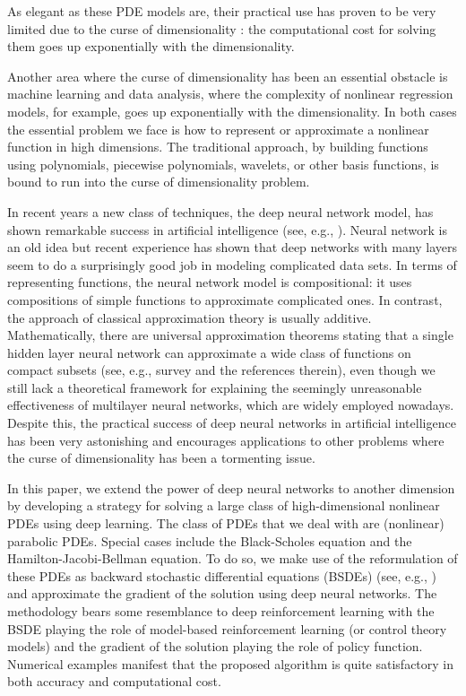 \documentclass[11pt,english]{article}
\begin{document}
As elegant as these PDE models are, their practical use has proven to be 
very limited
due to the curse of dimensionality \cite{Bellman1957}: the computational cost for solving
them goes up exponentially with the dimensionality.

Another area where the curse of dimensionality has been an essential obstacle is
machine learning and data analysis, where the complexity of nonlinear regression models,
for example, goes up exponentially with the dimensionality.
In both cases the essential problem we face
is how to represent or approximate a nonlinear function in high dimensions.
The traditional approach, by building functions using polynomials, piecewise polynomials,
wavelets, or other basis functions, is bound to run into the curse of dimensionality 
problem.

In recent years a new class of techniques, the deep neural network model, has shown remarkable success in artificial intelligence
(see, e.g., \cite{Goodfellow2016,LeCun2015,Krizhevsky2012,Hinton2012,Silver2016}).
 Neural network is an old idea but recent
experience has shown that deep networks with many layers seem to do a
surprisingly good job in modeling complicated data sets.
In terms of representing functions, the neural network model is compositional:
it uses compositions of simple functions to approximate
complicated ones.  In contrast, the approach of classical approximation theory is usually additive.
Mathematically, there are universal approximation theorems stating that a single hidden layer neural network can approximate a wide class of functions on compact subsets
(see, e.g., survey \cite{Pinkus1999} and the references therein), even though we still lack a theoretical framework for explaining the seemingly unreasonable effectiveness of multilayer neural networks, which are widely employed nowadays. Despite this, the practical success of deep neural networks in artificial intelligence has been very astonishing and encourages applications to
other problems where the curse of dimensionality has been a tormenting issue.

In this paper, we extend the power of deep neural networks to another dimension
by developing a strategy for solving a large class of high-dimensional
nonlinear PDEs using deep learning. The class of PDEs that we deal
with are (nonlinear) parabolic PDEs.  
Special cases include the Black-Scholes equation and the Hamilton-Jacobi-Bellman equation.
To do so, we make use of the reformulation of these PDEs as backward stochastic
differential equations (BSDEs) (see, e.g., \cite{Pardoux1992,Pardoux1999}) and 
approximate the gradient of the solution using deep neural networks. 
The methodology bears some resemblance to deep reinforcement learning with the BSDE playing
the role of model-based reinforcement learning (or control theory models)
and the gradient of the solution
playing the role of policy function.
Numerical examples manifest that the proposed algorithm is quite satisfactory in both
accuracy and computational cost.
\end{document}
